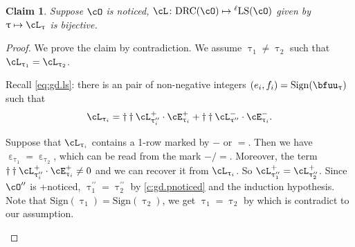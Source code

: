 \documentclass[12pt,a4paper]{amsart}
\numberwithin{equation}{section}
\newtheorem{claim}[thm]{Claim}
\theoremstyle{remark}
\def\ssign{\mathrm{Sign}}
\def\drc{\mathrm{DRC}}
\def\LLS{\mathrm{{}^{\ell} LS}}
\def\cOpp{\cO^{\prime\prime}}
\def\pcL{\cL^+}
\def\ncL{\cL^-}
\def\pcE{\cE^+}
\def\ncE{\cE^-}
\def\uptaup{\uptau^{\prime}}
\def\uptaupp{\uptau^{\prime\prime}}
\begin{document}
\begin{claim}\label{c:noticed.bij}
 Suppose $\cO$ is noticed, $\cL \colon \drc(\cO)\mapsto \LLS(\cO)$ given by
 $\uptau\mapsto \cL_{\uptau}$ is bijective.
\end{claim}
\begin{proof}
We prove the claim by contradiction. We assume $\uptau_{1}\neq \uptau_{2}$ such
that $\cL_{\uptau_{1}}=\cL_{\uptau_{2}}$.


Recall \eqref{eq:gd.ls}: there is an pair of non-negative integers
$(e_{i},f_{i})=\ssign(\bfuu_{\uptau})$ such that
\[
  \cL_{\uptau_{i}} = \dagger\dagger \pcL_{\uptaupp_{i}}\cdot \pcE_{\uptau_{i}}
  + \dagger\dagger \ncL_{\uptaupp} \cdot \ncE_{\uptau_{i}}.
\]

\begin{enumPF}
  \item
Suppose that $\cL_{\uptau_{i}}$ contains a 1-row marked by $-$ or $=$. Then we
have
$\upepsilon_{\uptau_{1}}=\upepsilon_{\uptau_{2}}$, which can be read from the mark $-/=$.
Moreover, the term
$\dagger\dagger\pcL_{\uptaupp_{i}}\cdot \pcE_{\uptau_{i}}\neq 0$ and we can
recover it from $\cL_{\uptau_{i}}$. So $\pcL_{\uptaupp_{1}} = \pcL_{\uptaupp_{2}}$.
Since $\cOpp$ is +noticed, $\uptaupp_{1}=\uptaupp_{2}$ by
\eqref{c:gd.pnoticed} and the induction hypothesis.
Note that $\ssign(\uptau_{1})=\ssign(\uptau_{2})$, we get
$\uptau_{1}=\uptau_{2}$ by  which is contradict to our assumption.



\end{enumPF}
\end{proof}
\end{document}
